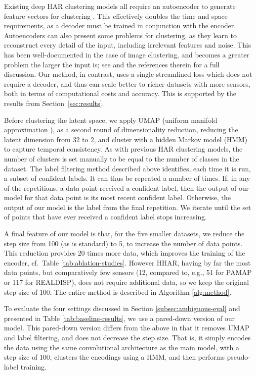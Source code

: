 \documentclass[wcp]{jmlr}
\begin{document}
Existing deep HAR clustering models all require an autoencoder to generate feature vectors for clustering \citep{sheng2020unsupervised,ma2021unsupervised,mcconville2021n2d}. This effectively doubles the time and space requirements, as a decoder must be trained in conjunction with the encoder. Autoencoders can also present some problems for clustering, as they learn to reconstruct every detail of the input, including irrelevant features and noise. This has been well-documented in the case of image clustering, and becomes a greater problem the larger the input is; see \citep{mrabah2020deep} and the references therein for a full discussion. Our method, in contrast, uses a single streamlined loss which does not require a decoder, and thus can scale better to richer datasets with more sensors, both in terms of computational costs and accuracy. This is supported by the results from Section~\ref{sec:results}.

Before clustering the latent space, we apply UMAP (uniform manifold approximation \citep{mcinnes2018umap}), as a second round of dimensionality reduction, reducing the latent dimension from $32$ to $2$, and cluster with a hidden Markov model (HMM) to capture temporal consistency. As with previous HAR clustering models, the number of clusters is set manually to be equal to the number of classes in the dataset.
 The label filtering method described above identifies, each time it is run, a subset of confident labels. It can thus be repeated a number of times. If, in any of the repetitions, a data point received a confident label, then the output of our model for that data point is its most recent confident label. Otherwise, the output of our model is the label from the final repetition. We iterate until the set of points that have ever received a confident label stops increasing.
 
 A final feature of our model is that, for the five smaller datasets, we reduce the step size from 100 (as is standard) to 5, to increase the number of data points. This reduction provides 20 times more data, which improves the training of the encoder, cf.\ Table \ref{tab:ablation-studies}. However HHAR, having by far the most data points, but comparatively few sensors (12, compared to, e.g., 51 for PAMAP or 117 for REALDISP), does not require additional data, so we keep the original step size of 100. The entire method is described in Algorithm \ref{alg:method}.

To evaluate the four settings discussed in Section \ref{subsec:ambiguous-eval} and presented in Table \ref{tab:baseline-results}, we use a pared-down version of our model. This pared-down version differs from the  above in that it removes UMAP and label filtering, and does not decrease the step size. That is, it simply encodes the data using the same convolutional architecture as the main model, with a step size of $100$, clusters the encodings using a HMM, and then performs pseudo-label training.
 
\end{document}
